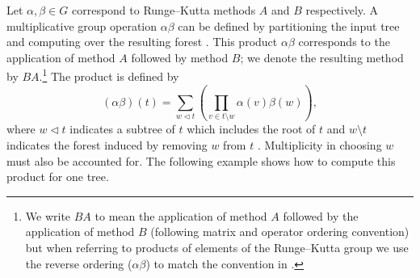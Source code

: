 

Let $\alpha, \beta \in G$ correspond to Runge--Kutta methods $A$ and $B$ respectively.
A multiplicative group operation $\alpha\beta$ can be defined
by partitioning the input tree and
computing over the resulting forest \cite{Butcher2008_book}.
This product $\alpha\beta$ corresponds to the application
of method $A$ followed by method $B$; we denote the resulting method by
$BA$.\footnote{We write $BA$ to mean the application of method $A$ followed by the application of method $B$
  (following matrix and operator ordering convention) but when referring to products of elements of the
  Runge--Kutta group we use the reverse ordering ($\alpha\beta$) to match the convention in
  \cite{Butcher2008_book}.}
The product is defined by
\begin{equation}\label{eq:Group_operation}
  (\alpha\beta)(t) = \sum_{w \lhd t} \left(\prod_{v \in t \setminus w} \alpha(v)\beta(w)\right),
\end{equation}
where $w \lhd t$ indicates a subtree of $t$ which includes the
root of $t$ and $w \setminus t$ indicates the forest induced
by removing $w$ from $t$ \cite{Butcher2008_book}.
Multiplicity in choosing $w$ must also be accounted for.
The following example shows how to compute this product for one tree.


